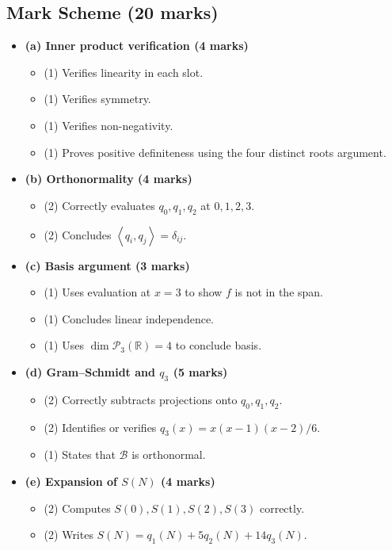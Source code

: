 \documentclass[12pt]{article}
\newcommand{\R}{\mathbb{R}}
\newcommand{\B}{\mathcal{B}}
\newcommand{\Ppoly}{\mathcal{P}}
\newcommand{\ip}[2]{\left\langle #1,#2\right\rangle}
\begin{document}
\newpage
\subsection{Mark Scheme (20 marks)}
\begin{itemize}[leftmargin=1.6em]
  \item \textbf{(a) Inner product verification (4 marks)}
  \begin{itemize}[leftmargin=1.6em]
    \item (1) Verifies linearity in each slot.
    \item (1) Verifies symmetry.
    \item (1) Verifies non-negativity.
    \item (1) Proves positive definiteness using the four distinct roots argument.
  \end{itemize}
  \item \textbf{(b) Orthonormality (4 marks)}
  \begin{itemize}[leftmargin=1.6em]
    \item (2) Correctly evaluates $q_0,q_1,q_2$ at $0,1,2,3$.
    \item (2) Concludes $\ip{q_i}{q_j}=\delta_{ij}$.
  \end{itemize}
  \item \textbf{(c) Basis argument (3 marks)}
  \begin{itemize}[leftmargin=1.6em]
    \item (1) Uses evaluation at $x=3$ to show $f$ is not in the span.
    \item (1) Concludes linear independence.
    \item (1) Uses $\dim\Ppoly_3(\R)=4$ to conclude basis.
  \end{itemize}
  \item \textbf{(d) Gram--Schmidt and $q_3$ (5 marks)}
  \begin{itemize}[leftmargin=1.6em]
    \item (2) Correctly subtracts projections onto $q_0,q_1,q_2$.
    \item (2) Identifies or verifies $q_3(x)=x(x-1)(x-2)/6$.
    \item (1) States that $\B$ is orthonormal.
  \end{itemize}
  \item \textbf{(e) Expansion of $S(N)$ (4 marks)}
  \begin{itemize}[leftmargin=1.6em]
    \item (2) Computes $S(0),S(1),S(2),S(3)$ correctly.
    \item (2) Writes $S(N)=q_1(N)+5q_2(N)+14q_3(N)$.
  \end{itemize}
\end{itemize}
\end{document}
